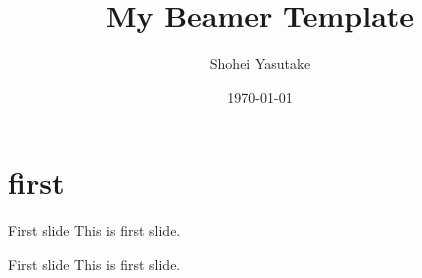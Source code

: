 \documentclass{beamer}
\title{My Beamer Template}
\author{Shohei Yasutake}
\institute{Tokyo Institute of Technology}
\date{\today}
\begin{document}
\maketitle

\section{first}

\begin{frame}{}
  \tableofcontents
\end{frame}

\begin{frame}{First slide}
  This is first slide.
\end{frame}

\begin{frame}{First slide}
  This is first slide.
\end{frame}
\end{document}
